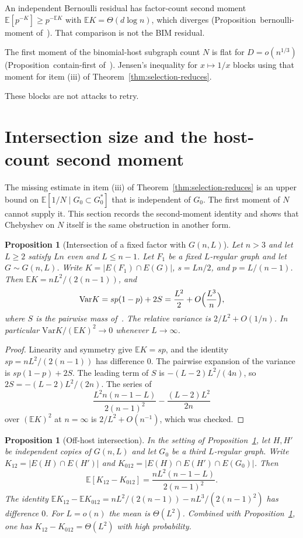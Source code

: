 \documentclass[11pt]{article}
\newtheorem{proposition}[theorem]{Proposition}
\newcommand{\EE}{\mathbb{E}}
\newcommand{\Var}{\mathrm{Var}}
\begin{document}
An independent Bernoulli residual has factor-count second moment
\(\EE[p^{-K}]\ge p^{-\EE K}\) with \(\EE K=\Theta(d\log n)\), which diverges
(Proposition~bernoulli-moment of~\cite{PlusOneV1}).
That comparison is not the BIM residual.

The first moment of the binomial-host subgraph count \(N\) is flat for
\(D=o(n^{1/3})\) (Proposition~contain-first of~\cite{PlusOneV1}).
Jensen's inequality for \(x\mapsto 1/x\) blocks using that moment for
item (iii) of Theorem~\ref{thm:selection-reduces}.

These blocks are not attacks to retry.

\section{Intersection size and the host-count second moment}

The missing estimate in item (iii) of Theorem~\ref{thm:selection-reduces} is
an upper bound on \(\EE[1/N\mid G_0\subset G^*_0]\) that is independent of
\(G_0\).
The first moment of \(N\) cannot supply it.
This section records the second-moment identity and shows that Chebyshev on
\(N\) itself is the same obstruction in another form.

\begin{proposition}[Intersection of a fixed factor with \(G(n,L)\)]
\label{prop:intersection-var}
Let \(n>3\) and let \(L\ge 2\) satisfy \(Ln\) even and \(L\le n-1\).
Let \(F_1\) be a fixed \(L\)-regular graph and let \(G\sim G(n,L)\).
Write \(K=\lvert E(F_1)\cap E(G)\rvert\), \(s=Ln/2\), and \(p=L/(n-1)\).
Then \(\EE K=nL^2/(2(n-1))\), and
\[
\Var K
=
sp(1-p)+2S
=
\frac{L^2}{2}+O\Bigl(\frac{L^3}{n}\Bigr),
\]
where \(S\) is the pairwise mass of~\cite[Proposition~pairwise-mass]{PlusOneV1}.
The relative variance is \(2/L^2+O(1/n)\).
In particular \(\Var K/(\EE K)^2\to 0\) whenever \(L\to\infty\).
\end{proposition}

\begin{proof}
Linearity and symmetry give \(\EE K=sp\), and the identity
\(sp=nL^2/(2(n-1))\) has difference \(0\).
The pairwise expansion of the variance is \(sp(1-p)+2S\).
The leading term of \(S\) is \(-(L-2)L^2/(4n)\), so
\(2S=-(L-2)L^2/(2n)\).
The series of
\[
\frac{L^2 n(n-1-L)}{2(n-1)^2}-\frac{(L-2)L^2}{2n}
\]
over \((\EE K)^2\) at \(n=\infty\) is \(2/L^2+O(n^{-1})\), which was checked.
\end{proof}

\begin{proposition}[Off-host intersection]
\label{prop:off-host}
In the setting of Proposition~\ref{prop:intersection-var}, let \(H,H'\) be
independent copies of \(G(n,L)\) and let \(G_0\) be a third \(L\)-regular graph.
Write \(K_{12}=\lvert E(H)\cap E(H')\rvert\) and
\(K_{012}=\lvert E(H)\cap E(H')\cap E(G_0)\rvert\).
Then
\[
\EE[K_{12}-K_{012}]
=
\frac{nL^2(n-1-L)}{2(n-1)^2}.
\]
The identity
\(\EE K_{12}-\EE K_{012}=nL^2/(2(n-1))-nL^3/(2(n-1)^2)\)
has difference \(0\).
For \(L=o(n)\) the mean is \(\Theta(L^2)\).
Combined with Proposition~\ref{prop:intersection-var}, one has
\(K_{12}-K_{012}=\Theta(L^2)\) with high probability.
\end{proposition}
\end{document}
